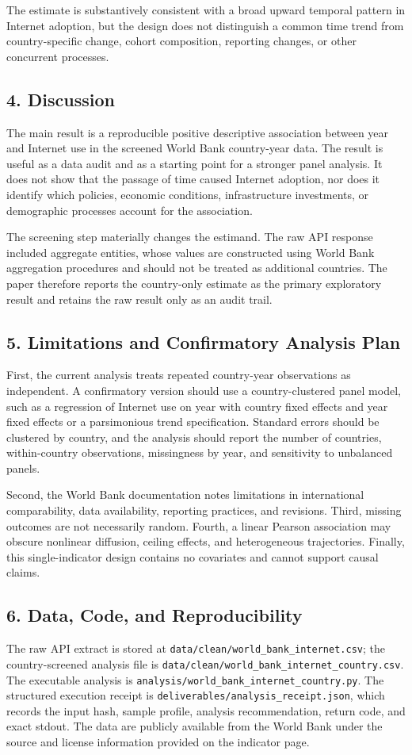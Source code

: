\documentclass[12pt]{article}
\begin{document}
The estimate is substantively consistent with a broad upward temporal pattern in Internet adoption, but the design does not distinguish a common time trend from country-specific change, cohort composition, reporting changes, or other concurrent processes.

\subsection{4. Discussion}
The main result is a reproducible positive descriptive association between year and Internet use in the screened World Bank country-year data. The result is useful as a data audit and as a starting point for a stronger panel analysis. It does not show that the passage of time caused Internet adoption, nor does it identify which policies, economic conditions, infrastructure investments, or demographic processes account for the association.

The screening step materially changes the estimand. The raw API response included aggregate entities, whose values are constructed using World Bank aggregation procedures and should not be treated as additional countries. The paper therefore reports the country-only estimate as the primary exploratory result and retains the raw result only as an audit trail.

\subsection{5. Limitations and Confirmatory Analysis Plan}
First, the current analysis treats repeated country-year observations as independent. A confirmatory version should use a country-clustered panel model, such as a regression of Internet use on year with country fixed effects and year fixed effects or a parsimonious trend specification. Standard errors should be clustered by country, and the analysis should report the number of countries, within-country observations, missingness by year, and sensitivity to unbalanced panels.

Second, the World Bank documentation notes limitations in international comparability, data availability, reporting practices, and revisions. Third, missing outcomes are not necessarily random. Fourth, a linear Pearson association may obscure nonlinear diffusion, ceiling effects, and heterogeneous trajectories. Finally, this single-indicator design contains no covariates and cannot support causal claims.

\subsection{6. Data, Code, and Reproducibility}
The raw API extract is stored at \texttt{data/clean/world\_bank\_internet.csv}; the country-screened analysis file is \texttt{data/clean/world\_bank\_internet\_country.csv}. The executable analysis is \texttt{analysis/world\_bank\_internet\_country.py}. The structured execution receipt is \texttt{deliverables/analysis\_receipt.json}, which records the input hash, sample profile, analysis recommendation, return code, and exact stdout. The data are publicly available from the World Bank under the source and license information provided on the indicator page.
\end{document}
